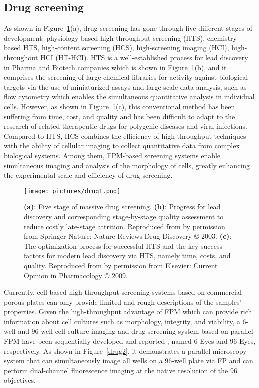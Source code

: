 \documentclass[journal,review,submit,pdftex,moreauthors]{Definitions/mdpi}
\begin{document}
\subsection{Drug screening}

As shown in Figure~\ref{drug1}(a), drug screening has gone through five different stages of development: physiology-based high-throughput screening (HTS), chemistry-based HTS, high-content screening (HCS), high-screening imaging (HCI), high-throughout HCI (HT-HCI). HTS is a well-established process for lead discovery in Pharma and Biotech companies\cite{bleicher2003hit} which is shown in Figure~\ref{drug1}(b), and it comprises the screening of large chemical libraries for activity against biological targets via the use of miniaturized assays and large-scale data analysis\cite{mayr2009novel}, such as flow cytometry which enables the simultaneous quantitative analysis in individual cells\cite{edwards2004flow}. However, as shown in Figure~\ref{drug1}(c), this conventional method has been suffering from time, cost, and quality and has been difficult to adapt to the research of related therapeutic drugs for polygenic diseases and viral infections\cite{mayr2009novel}. Compared to HTS, HCS combines the efficiency of high-throughput techniques with the ability of cellular imaging to collect quantitative data from complex biological systems\cite{zanella2010high, boutros2015microscopy, lang2006cellular}. Among them, FPM-based screening systems enable simultaneous imaging and analysis of the morphology of cells, greatly enhancing the experimental scale and efficiency of drug screening. 

\begin{figure}[H]
\texttt{[image: pictures/drug1.png]}
\caption{\textbf{(a)}: Five stage of massive drug screening. \textbf{(b)}: Progress for lead discovery and corresponding stage-by-stage quality assessment to reduce costly late-stage attrition. Reproduced from \cite{bleicher2003hit} by permission from Springer Nature: Nature Reviews Drug Discovery © 2003. \textbf{(c)}: The optimization process for successful HTS and the key success factors for modern lead discovery via HTS, namely time, costs, and quality. Reproduced from \cite{mayr2009novel} by permission from Elsevier: Current Opinion in Pharmacology © 2009. \label{drug1}}
\end{figure}  

Currently, cell-based high-throughput screening systems based on commercial porous plates can only provide limited and rough descriptions of the samples' properties. Given the high-throughput advantage of FPM which can provide rich information about cell cultures such as morphology, integrity, and viability, a 6-well and 96-well cell culture imaging and drug screening system based on parallel FPM have been sequentially developed and reported \cite{kim2016incubator, chan2019parallel, pan2019situ}, named 6 Eyes and 96 Eyes, respectively. As shown in Figure~\ref{drug2}, it demonstrates a parallel microscopy system that can simultaneously image all wells on a 96-well plate via FP and can perform dual-channel fluorescence imaging at the native resolution of the 96 objectives. 
\end{document}
